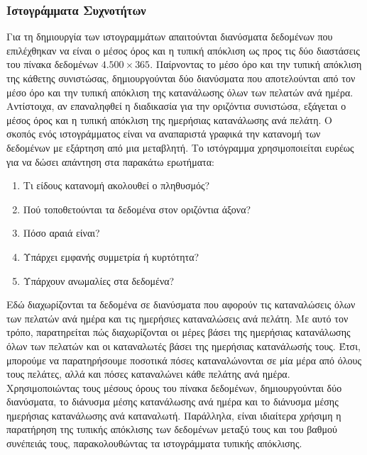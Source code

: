 \subsubsection{Ιστογράμματα Συχνοτήτων}
\label{sec:histograms}
Για τη δημιουργία των ιστογραμμάτων απαιτούνται διανύσματα δεδομένων που επιλέχθηκαν να είναι ο μέσος  όρος και η τυπική απόκλιση ως προς τις δύο διαστάσεις του πίνακα δεδομένων $4.500 \times 365$. Παίρνοντας το μέσο όρο και την τυπική απόκλιση της κάθετης συνιστώσας, δημιουργούνται δύο διανύσματα που αποτελούνται από τον μέσο όρο και την τυπική απόκλιση της κατανάλωσης όλων των πελατών ανά ημέρα. Αντίστοιχα, αν επαναληφθεί η διαδικασία για την οριζόντια συνιστώσα, εξάγεται ο μέσος όρος και η τυπική απόκλιση της ημερήσιας κατανάλωσης ανά πελάτη. Ο σκοπός ενός ιστογράμματος είναι να αναπαριστά γραφικά την κατανομή των δεδομένων με εξάρτηση από μια μεταβλητή. Το ιστόγραμμα χρησιμοποιείται ευρέως για να δώσει απάντηση στα παρακάτω ερωτήματα\cite{histogram}:\par
\begin{enumerate}
\item Τι είδους κατανομή ακολουθεί ο πληθυσμός?
\item Πού τοποθετούνται τα δεδομένα στον οριζόντια άξονα?
\item Πόσο αραιά είναι?
\item Υπάρχει εμφανής συμμετρία ή κυρτότητα?
\item Υπάρχουν ανωμαλίες στα δεδομένα?
\end{enumerate}
\par Εδώ διαχωρίζονται τα δεδομένα σε διανύσματα που αφορούν τις καταναλώσεις όλων των πελατών ανά ημέρα και τις ημερήσιες καταναλώσεις ανά πελάτη. Με αυτό τον τρόπο, παρατηρείται πώς διαχωρίζονται οι μέρες βάσει της ημερήσιας κατανάλωσης όλων των πελατών και οι καταναλωτές βάσει της ημερήσιας  κατανάλωσής τους. Έτσι, μπορούμε να παρατηρήσουμε ποσοτικά πόσες  καταναλώνονται σε μία μέρα από όλους τους πελάτες, αλλά και πόσες  καταναλώνει κάθε πελάτης ανά ημέρα. Χρησιμοποιώντας τους μέσους όρους του πίνακα δεδομένων, δημιουργούνται δύο διανύσματα, το διάνυσμα μέσης κατανάλωσης ανά ημέρα και το διάνυσμα μέσης ημερήσιας κατανάλωσης ανά καταναλωτή.  Παράλληλα, είναι ιδιαίτερα χρήσιμη η παρατήρηση της τυπικής απόκλισης των δεδομένων μεταξύ τους και του βαθμού συνέπειάς τους, παρακολουθώντας τα ιστογράμματα τυπικής απόκλισης.\par

